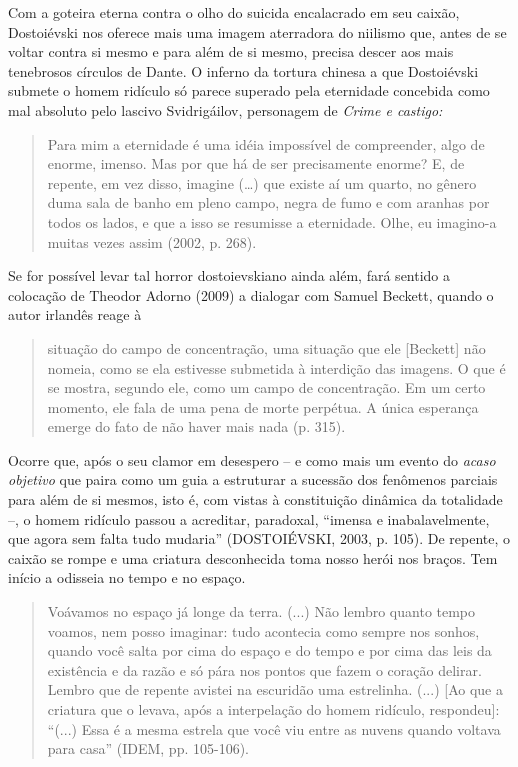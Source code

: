 Com a goteira eterna contra o olho do suicida encalacrado em seu caixão,
Dostoiévski nos oferece mais uma imagem aterradora do niilismo que,
antes de se voltar contra si mesmo e para além de si mesmo, precisa
descer aos mais tenebrosos círculos de Dante. O inferno da tortura
chinesa a que Dostoiévski submete o homem ridículo só parece superado
pela eternidade concebida como mal absoluto pelo lascivo Svidrigáilov,
personagem de \emph{Crime e castigo: }

\begin{quote}
Para mim a eternidade é uma idéia impossível de compreender, algo de
enorme, imenso. Mas por que há de ser precisamente enorme? E, de
repente, em vez disso, imagine (\ldots{}) que existe aí um quarto, no
gênero duma sala de banho em pleno campo, negra de fumo e com aranhas
por todos os lados, e que a isso se resumisse a eternidade. Olhe, eu
imagino-a muitas vezes assim (2002, p. 268).
\end{quote}

Se for possível levar tal horror dostoievskiano ainda além, fará sentido
a colocação de Theodor Adorno (2009) a dialogar com Samuel Beckett,
quando o autor irlandês reage à

\begin{quote}
situação do campo de concentração, uma situação que ele {[}Beckett{]}
não nomeia, como se ela estivesse submetida à interdição das imagens. O
que é se mostra, segundo ele, como um campo de concentração. Em um certo
momento, ele fala de uma pena de morte perpétua. A única esperança
emerge do fato de não haver mais nada (p. 315).
\end{quote}

Ocorre que, após o seu clamor em desespero -- e como mais um evento do
\emph{acaso objetivo} que paira como um guia a estruturar a sucessão dos
fenômenos parciais para além de si mesmos, isto é, com vistas à
constituição dinâmica da totalidade --, o homem ridículo passou a
acreditar, paradoxal, ``imensa e inabalavelmente, que agora sem falta
tudo mudaria'' (DOSTOIÉVSKI, 2003, p. 105). De repente, o caixão se
rompe e uma criatura desconhecida toma nosso herói nos braços. Tem
início a odisseia no tempo e no espaço.

\begin{quote}
Voávamos no espaço já longe da terra. (...) Não lembro quanto tempo
voamos, nem posso imaginar: tudo acontecia como sempre nos sonhos,
quando você salta por cima do espaço e do tempo e por cima das leis da
existência e da razão e só pára nos pontos que fazem o coração delirar.
Lembro que de repente avistei na escuridão uma estrelinha. (...) {[}Ao
que a criatura que o levava, após a interpelação do homem ridículo,
respondeu{]}: ``(...) Essa é a mesma estrela que você viu entre as
nuvens quando voltava para casa'' (IDEM, pp. 105-106).
\end{quote}

